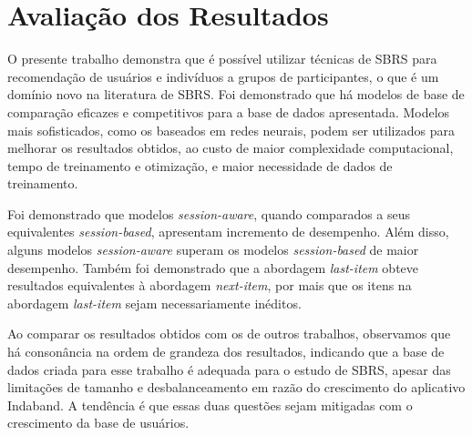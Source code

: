 \section{Avaliação dos Resultados}
O presente trabalho demonstra que é possível utilizar técnicas de SBRS para
recomendação de usuários e indivíduos a grupos de participantes, o que é um
domínio novo na literatura de SBRS. Foi demonstrado que há modelos de base de
comparação eficazes e competitivos para a base de dados apresentada. Modelos
mais sofisticados, como os baseados em redes neurais, podem ser utilizados para
melhorar os resultados obtidos, ao custo de maior complexidade computacional,
tempo de treinamento e otimização, e maior necessidade de dados de treinamento.

Foi demonstrado que modelos \textit{session-aware}, quando comparados a seus
equivalentes \textit{session-based}, apresentam incremento de desempenho. Além
disso, alguns modelos \textit{session-aware} superam os modelos
\textit{session-based} de maior desempenho. Também foi demonstrado que a
abordagem \textit{last-item} obteve resultados equivalentes à abordagem
\textit{next-item}, por mais que os itens na abordagem \textit{last-item} sejam
necessariamente inéditos.

Ao comparar os resultados obtidos com os de outros trabalhos, observamos que há
consonância na ordem de grandeza dos resultados, indicando que a base de dados
criada para esse trabalho é adequada para o estudo de SBRS, apesar das
limitações de tamanho e desbalanceamento em razão do crescimento do aplicativo
Indaband. A tendência é que essas duas questões sejam mitigadas com o crescimento da base
de usuários.